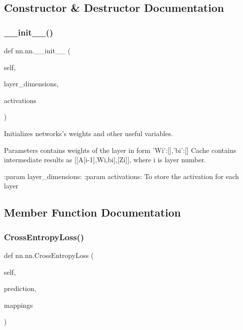 \subsection{Constructor \& Destructor Documentation}
\mbox{\label{classnn_1_1nn_ad7304c7932970a07bf2869e97b79e0b5}} 
\subsubsection{\texorpdfstring{\+\_\+\+\_\+init\+\_\+\+\_\+()}{\_\_init\_\_()}}
{\footnotesize\ttfamily def nn.\+nn.\+\_\+\+\_\+init\+\_\+\+\_\+ (\begin{DoxyParamCaption}\item[{}]{self,  }\item[{}]{layer\+\_\+dimensions,  }\item[{}]{activations }\end{DoxyParamCaption})}

\begin{DoxyVerb}Initializes networks's weights and other useful variables.

Parameters contains weights of the layer in form {'Wi':[],'bi':[]}
Cache contains intermediate results as [[A[i-1],Wi,bi],[Zi]], where i
is layer number.

:param layer_dimensions:
:param activations: To store the activation for each layer
\end{DoxyVerb}
 

\subsection{Member Function Documentation}
\mbox{\label{classnn_1_1nn_a822299322a0b513f8985e61096be45bc}} 
\subsubsection{\texorpdfstring{Cross\+Entropy\+Loss()}{CrossEntropyLoss()}}
{\footnotesize\ttfamily def nn.\+nn.\+Cross\+Entropy\+Loss (\begin{DoxyParamCaption}\item[{}]{self,  }\item[{}]{prediction,  }\item[{}]{mappings }\end{DoxyParamCaption})}

